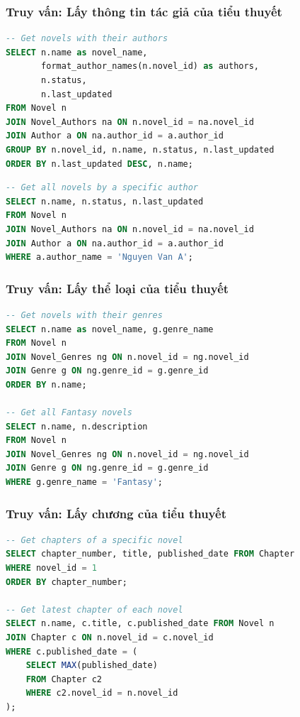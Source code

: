 \documentclass[12pt,aspectratio=169,handout]{beamer}
\begin{document}
\begin{frame}
\frametitle{Truy vấn: Lấy thông tin tác giả của tiểu thuyết}
\begin{lstlisting}[language=SQL, basicstyle=\small\ttfamily]
-- Get novels with their authors
SELECT n.name as novel_name, 
       format_author_names(n.novel_id) as authors, 
       n.status, 
       n.last_updated
FROM Novel n
JOIN Novel_Authors na ON n.novel_id = na.novel_id
JOIN Author a ON na.author_id = a.author_id
GROUP BY n.novel_id, n.name, n.status, n.last_updated
ORDER BY n.last_updated DESC, n.name;
\end{lstlisting}
\framebreak

\begin{lstlisting}[language=SQL, basicstyle=\small\ttfamily]
-- Get all novels by a specific author
SELECT n.name, n.status, n.last_updated
FROM Novel n
JOIN Novel_Authors na ON n.novel_id = na.novel_id
JOIN Author a ON na.author_id = a.author_id
WHERE a.author_name = 'Nguyen Van A';
\end{lstlisting}
\end{frame}

\begin{frame}[fragile]
\frametitle{Truy vấn: Lấy thể loại của tiểu thuyết}
\begin{lstlisting}[language=SQL, basicstyle=\small\ttfamily]
-- Get novels with their genres
SELECT n.name as novel_name, g.genre_name 
FROM Novel n
JOIN Novel_Genres ng ON n.novel_id = ng.novel_id
JOIN Genre g ON ng.genre_id = g.genre_id
ORDER BY n.name;

-- Get all Fantasy novels
SELECT n.name, n.description
FROM Novel n
JOIN Novel_Genres ng ON n.novel_id = ng.novel_id
JOIN Genre g ON ng.genre_id = g.genre_id
WHERE g.genre_name = 'Fantasy';
\end{lstlisting}
\end{frame}

\begin{frame}[fragile]
\frametitle{Truy vấn: Lấy chương của tiểu thuyết}
\begin{lstlisting}[language=SQL, basicstyle=\small\ttfamily]
-- Get chapters of a specific novel
SELECT chapter_number, title, published_date FROM Chapter 
WHERE novel_id = 1 
ORDER BY chapter_number;

-- Get latest chapter of each novel
SELECT n.name, c.title, c.published_date FROM Novel n
JOIN Chapter c ON n.novel_id = c.novel_id
WHERE c.published_date = (
    SELECT MAX(published_date) 
    FROM Chapter c2 
    WHERE c2.novel_id = n.novel_id
);
\end{lstlisting}
\end{frame}
\end{document}
